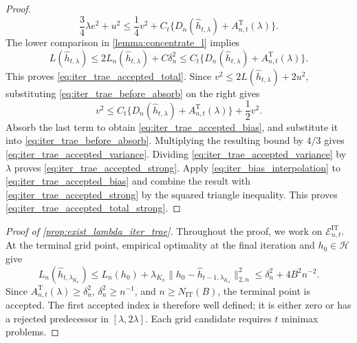 \begin{proof}
\begin{equation}\label{eq:iter_trae_before_absorb}
\frac34\lambda e^2+u^2 \leqslant \frac14v^2+C_t\{D_n(\hat h_{t,\lambda})+A_{n,t}^{\mathrm T}(\lambda)\}.
\end{equation}
The lower comparison in \cref{lemma:concentrate_l} implies
\[
L(\hat h_{t,\lambda})
\leqslant2L_n(\hat h_{t,\lambda})+C\delta_n^2
\leqslant C_t\{D_n(\hat h_{t,\lambda})+A_{n,t}^{\mathrm T}(\lambda)\}.
\]
This proves \eqref{eq:iter_trae_accepted_total}.
Since $v^2\leqslant2L(\hat h_{t,\lambda})+2u^2$, substituting \eqref{eq:iter_trae_before_absorb} on the right gives
\[
v^2\leqslant C_t\{D_n(\hat h_{t,\lambda})+A_{n,t}^{\mathrm T}(\lambda)\}+\frac12v^2.
\]
Absorb the last term to obtain \eqref{eq:iter_trae_accepted_bias}, and substitute it into \eqref{eq:iter_trae_before_absorb}. Multiplying the resulting bound by $4/3$ gives \eqref{eq:iter_trae_accepted_variance}. Dividing \eqref{eq:iter_trae_accepted_variance} by $\lambda$ proves
\eqref{eq:iter_trae_accepted_strong}. Apply
\eqref{eq:iter_bias_interpolation} to
\eqref{eq:iter_trae_accepted_bias} and combine the result with
\eqref{eq:iter_trae_accepted_strong} by the squared triangle inequality.
This proves \eqref{eq:iter_trae_accepted_total_strong}.
\end{proof}

\begin{proof}[Proof of \cref{prop:exist_lambda_iter_trae}]
Throughout the proof, we work on $\mathcal E_{n,t}^{\mathrm{IT}}$. At the terminal grid point, empirical optimality at the final iteration and $h_0\in\mathcal H$ give
\[
L_n(\hat h_{t,\lambda_{K_n}})
\leqslant L_n(h_0)+\lambda_{K_n}\|h_0-\hat h_{t-1,\lambda_{K_n}}\|_{2,n}^2
\leqslant\delta_n^2+4B^2n^{-2}.
\]
Since $A_{n,t}^{\mathrm T}(\lambda)\geqslant\delta_n^2$, $\delta_n^2\geqslant n^{-1}$, and $n\geqslant N_{\mathrm{IT}}(B)$, the terminal point is accepted. The first accepted index is therefore well defined; it is either zero or has a rejected predecessor in $[\lambda,2\lambda]$. Each grid candidate requires $t$ minimax problems.
\end{proof}

